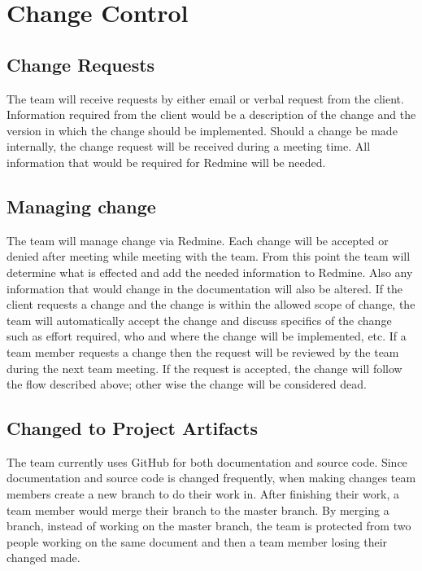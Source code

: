 \section{Change Control}
\subsection{Change Requests}
The team will receive requests by either email or verbal request from the client.  Information required from the client would be a description of the change and the version in which the change should be implemented.  Should a change be made internally, the change request will be received during a meeting time.  All information that would be required for Redmine will be needed.

\subsection{Managing change}
The team will manage change via Redmine.  Each change will be accepted or denied after meeting while meeting with the team.  From this point the team will determine what is effected and add the needed information to Redmine.  Also any information that would change in the documentation will also be altered.  If the client requests a change and the change is within the allowed scope of change, the team will automatically accept the change and discuss specifics of the change such as effort required, who and where the change will be implemented, etc. If a team member requests a change then the request will be reviewed by the team during the next team meeting.  If the request is accepted, the change will follow the flow described above; other wise the change will be considered dead.

\subsection{Changed to Project Artifacts}
The team currently uses GitHub for both documentation and source code.  Since documentation and source code is changed frequently, when making changes team members create a new branch to do their work in.  After finishing their work, a team member would merge their branch to the master branch.  By merging a branch, instead of working on the master branch, the team is protected from two people working on the same document and then a team member losing their changed made.